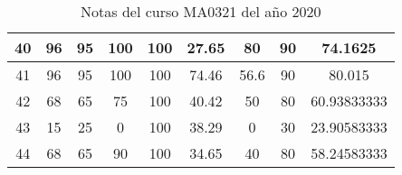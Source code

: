 \begin{table}[H]
\begin{tabular}{|c|c|c|c|c|c|c|c|c|}
40          & 96          & 95          & 100         & 100          & 27.65       & 80          & 90            & 74.1625             \\ \hline
41          & 96          & 95          & 100         & 100          & 74.46       & 56.6        & 90            & 80.015              \\ \hline
42          & 68          & 65          & 75          & 100          & 40.42       & 50          & 80            & 60.93833333         \\ \hline
43          & 15          & 25          & 0           & 100          & 38.29       & 0           & 30            & 23.90583333         \\ \hline
44          & 68          & 65          & 90          & 100          & 34.65       & 40          & 80            & 58.24583333         \\ \hline
\end{tabular}
    \caption{Notas del curso MA0321 del año 2020}
    \label{tab:notas}
\end{table}


